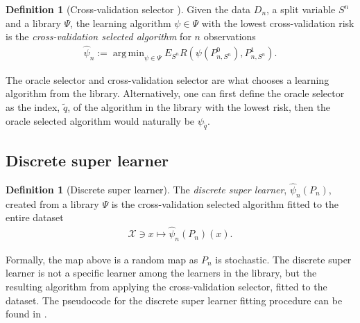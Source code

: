 \documentclass[11pt, a4paper]{article}
\theoremstyle{definition}
\newtheorem{definition}[theorem]{Definition}
\theoremstyle{remark}
\DeclareMathOperator*{\argmin}{arg\,min}
\newcommand{\q}{q}
\newcommand{\btheta}{\theta}
\newcommand{\la}{\psi}
\newcommand{\Sn}{S^n}
\newcommand{\lib}{\Psi}
\begin{document}
\begin{definition}[Cross-validation selector \parencite{laan03}] \label{def:cvselector}
    Given the data $ D_n $, a split variable $ \Sn $ and a library $ \lib $, the learning algorithm $ \la \in \lib $ with the lowest cross-validation risk is the \textit{cross-validation selected algorithm} for $ n $ observations
    \begin{align*}
        \hat{\la}_n := \argmin_{\la \in \lib} E_{\Sn} R(\la(P_{n,\Sn}^0 ) , P_{n, \Sn}^{1}).
    \end{align*}
\end{definition}
%
The oracle selector and cross-validation selector are what chooses a learning algorithm from the library. Alternatively, one can first define the oracle selector as the index, $ \tilde{\q} $, of the algorithm in the library with the lowest risk, then the oracle selected algorithm would naturally be $ \la_{ \tilde{\q} } $. 

\subsection{Discrete super learner}
\begin{definition}[Discrete super learner]
    The \textit{discrete super learner}, $ \hat{\la}_n(P_n) $, created from a library $ \lib $ is the cross-validation selected algorithm fitted to the entire dataset 
    \begin{align*}
        \mathcal{X} \ni x \mapsto \hat{\la}_n(P_n)(x). 
    \end{align*}
\end{definition}
Formally, the map above is a random map as $ P_n $ is stochastic. The discrete super learner is not a specific learner among the learners in the library, but the resulting algorithm from applying the cross-validation selector, fitted to the dataset. The pseudocode for the discrete super learner fitting procedure can be found in .
\end{document}
